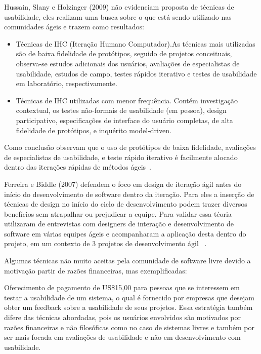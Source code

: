 \documentclass[12pt]{article}
\begin{document}
Hussain, Slany e Holzinger (2009) não evidenciam proposta de técnicas de usabilidade, eles realizam uma busca sobre o que está sendo utilizado nas comunidades ágeis e trazem como resultados:
\begin{itemize}
\item Técnicas de IHC (Iteração Humano Computador).As técnicas mais utilizadas são de baixa fidelidade de protótipos, seguido de projetos conceituais, observa-se estudos adicionais dos usuários, avaliações de especialistas de usabilidade, estudos de campo, testes rápidos iterativo e testes de usabilidade em laboratório, respectivamente.
\item Técnicas de IHC utilizadas com menor frequência. Contém investigação contextual, os testes não-formais de usabilidade (em pessoa), design participativo, especificações de interface do usuário completas, de alta fidelidade de protótipos, e inquérito model-driven.
\end{itemize}

Como conclusão observam que o uso de protótipos de baixa fidelidade, avaliações de especialistas de usabilidade, e teste rápido iterativo é facilmente alocado dentro das iterações rápidas de métodos ágeis~\cite{}. 

Ferreira e Biddle (2007) defendem o foco em design de iteração ágil antes do início do desenvolvimento de software dentro da iteração. Para eles a inserção de técnicas de design no início do ciclo de desenvolvimento podem trazer diversos benefícios sem atrapalhar ou prejudicar a equipe. Para validar essa téoria utilizaram de entrevistas com designers de interação e desenvolvimento de software em várias equipes ágeis e acompanharam a aplicação desta dentro do projeto, em um contexto de 3 projetos de desenvolvimento ágil ~\cite{}. 

%
Algumas técnicas não muito aceitas pela comunidade de software livre devido a motivação partir de razões financeiras, mas exemplificadas:

%
Oferecimento de pagamento de US\$15,00 para pessoas que se interessem em testar a usabilidade de um sistema, o qual é fornecido por empresas que desejam obter um feedback sobre a usabilidade de seus projetos. Essa estratégia também difere das técnicas abordadas, pois os usuários envolvidos são motivados por razões financeiras e não filosóficas como no caso de sistemas livres e também por ser mais focada em avaliações de usabilidade e não em desenvolvimento com usabilidade.~\cite{}%
\end{document}
